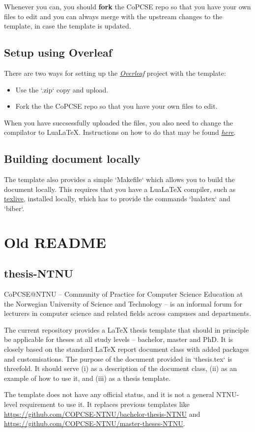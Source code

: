 \documentclass[../thesis.tex]{subfiles}
\begin{document}
Whenever you can, you should \textbf{fork} the CoPCSE repo so that you have your own files to edit and you can always merge with the upstream changes to the template, in case the template is updated. 

\subsection{Setup using Overleaf}

There are two ways for setting up the \href{http://overleaf.com}{\textit{Overleaf}} project with the template:

\begin{itemize}
    \item Use the `.zip` copy and upload.
    \item Fork the the CoPCSE repo so that you have your own files to edit.
\end{itemize}

When you have succsessfully uploaded the files, you also need to change the compilator to LuaLaTeX. Instructions on how to do that may be found \href{https://www.overleaf.com/learn/how-to/Changing_compiler}{\textit{here}}.

\subsection{Building document locally}

The template also provides a simple `Makefile` which allows you to build the document locally. This requires that you have a LuaLaTeX compiler, such as \href{https://www.tug.org/texlive/}{texlive}, installed locally, which has to provide the commands `lualatex` and `biber`.


\section{Old README}

\subsection{thesis-NTNU}

CoPCSE@NTNU – Community of Practice for Computer Science Education at the Norwegian University of Science and Technology – is an informal forum for lecturers in computer science and related fields across campuses and departments.

The current repository provides a LaTeX thesis template that should in principle be applicable for theses at all study levels – bachelor, master and PhD. It is closely based on the standard LaTeX report document class with added packages and customisations. The purpose of the document provided in `thesis.tex` is threefold. It should serve (i) as a description of the document class, (ii) as an example of how to use it, and (iii) as a thesis template.

The template does not have any official status, and it is not a general NTNU-level requirement to use it. It replaces previous templates like \url{https://github.com/COPCSE-NTNU/bachelor-thesis-NTNU} and \url{https://github.com/COPCSE-NTNU/master-theses-NTNU}.
\end{document}
